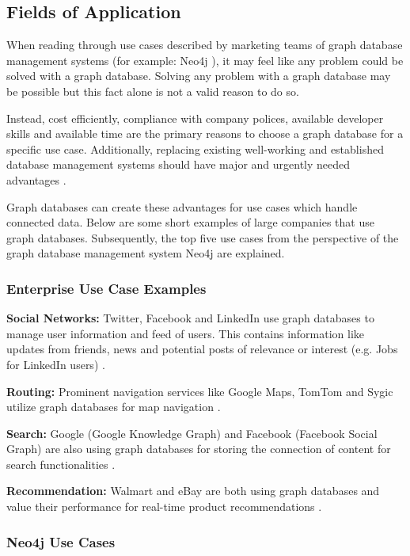 \subsection{Fields of Application} \label{section:FoA}
When reading through use cases described by marketing teams of graph database management systems (for example: Neo4j \autocite{neo4j:why_graphdb, neo4j:use_cases}
), it may feel like any problem could be solved with a graph database. Solving any problem with a graph database may be possible but this fact alone is not a valid reason to do so.

Instead, cost efficiently, compliance with company polices, available developer skills and available time are the primary reasons to choose a graph database for a specific use case. Additionally, replacing existing well-working and established database management systems should have major and urgently needed advantages \autocite{graphdb2015}.

Graph databases can create these advantages for use cases which handle connected data. Below are some short examples of large companies that use graph databases. Subsequently, the top five use cases from the perspective of the graph database management system Neo4j are explained.

\subsubsection{Enterprise Use Case Examples}
\textbf{Social Networks:} Twitter, Facebook and LinkedIn use graph databases to manage user information and feed of users. This contains information like updates from friends, news and potential posts of relevance or interest (e.g. Jobs for LinkedIn users) \autocite{maheshlal2015}.

\textbf{Routing:} Prominent navigation services like Google Maps, TomTom and Sygic utilize graph databases for map navigation \autocite{maheshlal2015}.

\textbf{Search:} Google (Google Knowledge Graph) and Facebook (Facebook Social Graph) are also using graph databases for storing the connection of content for search functionalities \autocite{maheshlal2015}.

\textbf{Recommendation:} Walmart and eBay are both using graph databases and value their performance for real-time product recommendations \autocite{neo4j:use_cases}.

\subsubsection{Neo4j Use Cases}

